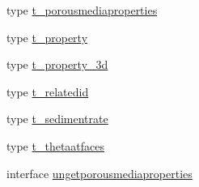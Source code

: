 \begin{DoxyCompactItemize}
type \mbox{\hyperlink{structmoduleporousmediaproperties_1_1t__porousmediaproperties}{t\+\_\+porousmediaproperties}}
\item 
type \mbox{\hyperlink{structmoduleporousmediaproperties_1_1t__property}{t\+\_\+property}}
\item 
type \mbox{\hyperlink{structmoduleporousmediaproperties_1_1t__property__3d}{t\+\_\+property\+\_\+3d}}
\item 
type \mbox{\hyperlink{structmoduleporousmediaproperties_1_1t__relatedid}{t\+\_\+relatedid}}
\item 
type \mbox{\hyperlink{structmoduleporousmediaproperties_1_1t__sedimentrate}{t\+\_\+sedimentrate}}
\item 
type \mbox{\hyperlink{structmoduleporousmediaproperties_1_1t__thetaatfaces}{t\+\_\+thetaatfaces}}
\item 
interface \mbox{\hyperlink{interfacemoduleporousmediaproperties_1_1ungetporousmediaproperties}{ungetporousmediaproperties}}
\end{DoxyCompactItemize}
